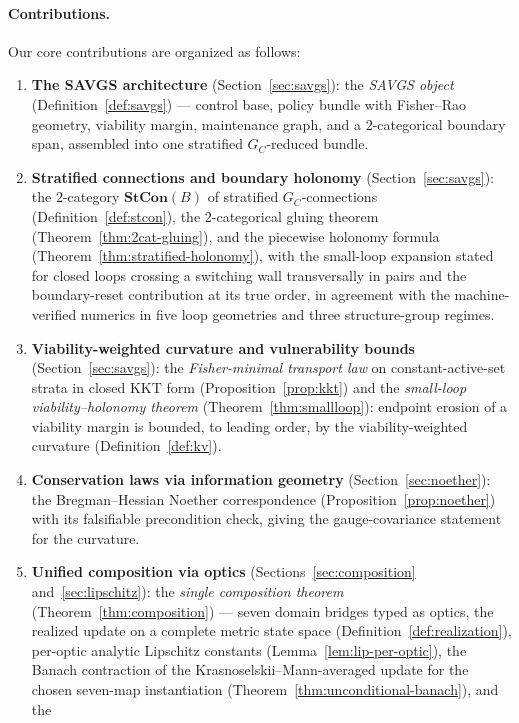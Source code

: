 \documentclass[11pt,a4paper]{article}
\theoremstyle{plain}
\theoremstyle{definition}
\theoremstyle{remark}
\begin{document}
\paragraph{Contributions.}
Our core contributions are organized as follows:
\begin{enumerate}[leftmargin=*,itemsep=2pt]
\item \textbf{The SAVGS architecture}
(Section~\ref{sec:savgs}): the \emph{SAVGS object}
(Definition~\ref{def:savgs}) --- control base, policy bundle with
Fisher--Rao geometry, viability margin, maintenance graph, and a
$2$-categorical boundary span, assembled into one stratified
$G_C$-reduced bundle.
\item \textbf{Stratified connections and boundary holonomy}
(Section~\ref{sec:savgs}): the $2$-category $\mathbf{StCon}(B)$ of
stratified $G_C$-connections (Definition~\ref{def:stcon}), the
$2$-categorical gluing theorem (Theorem~\ref{thm:2cat-gluing}), and
the piecewise holonomy formula
(Theorem~\ref{thm:stratified-holonomy}), with the small-loop
expansion stated for closed loops crossing a switching wall
transversally in pairs and the boundary-reset contribution at its
true order, in agreement with the machine-verified numerics in
five loop geometries and three structure-group regimes.
\item \textbf{Viability-weighted curvature and vulnerability
bounds} (Section~\ref{sec:savgs}): the \emph{Fisher-minimal
transport law} on constant-active-set strata in closed KKT form
(Proposition~\ref{prop:kkt}) and the \emph{small-loop
viability--holonomy theorem} (Theorem~\ref{thm:smallloop}): endpoint
erosion of a viability margin is bounded, to leading order, by the
viability-weighted curvature (Definition~\ref{def:kv}).
\item \textbf{Conservation laws via information geometry}
(Section~\ref{sec:noether}): the Bregman--Hessian Noether
correspondence (Proposition~\ref{prop:noether}) with its
falsifiable precondition check, giving the gauge-covariance
statement for the curvature.
\item \textbf{Unified composition via optics}
(Sections~\ref{sec:composition} and~\ref{sec:lipschitz}): the
\emph{single composition theorem}
(Theorem~\ref{thm:composition}) --- seven domain bridges typed as
optics, the realized update on a complete metric state space
(Definition~\ref{def:realization}), per-optic analytic Lipschitz
constants (Lemma~\ref{lem:lip-per-optic}), the Banach contraction
of the Krasnoselskii--Mann-averaged update for the chosen seven-map
instantiation (Theorem~\ref{thm:unconditional-banach}), and the

\end{enumerate}
\end{document}
